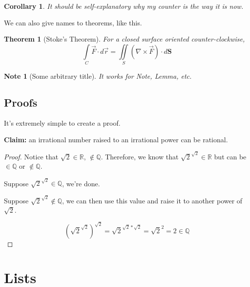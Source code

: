 \documentclass[12pt]{article}
\newtheorem*{Theorem}{Theorem}
\newtheorem{Corollary}{Corollary}[Lemma]
\newtheorem{Note}[Lemma]{Note}
\begin{document}
\begin{Corollary}
It should be self-explanatory why my counter is the way it is now.
\end{Corollary}

We can also give names to theorems, like this.

\begin{Theorem}[Stoke's Theorem]
For a closed surface oriented counter-clockwise,
\[ \int\limits_C \vec{F} \cdot d\vec{r} = \iint\limits_S (\nabla \times \vec{F}) \cdot d\textbf{S} \]
\end{Theorem}

\begin{Note}[Some arbitrary title]
It works for \emph{Note}, \emph{Lemma}, etc.
\end{Note}

\subsection{Proofs}

It's extremely simple to create a proof.

\medskip

\textbf{Claim:} an irrational number raised to an irrational power can be rational.
\begin{proof}

Notice that $\sqrt{2} \in \mathbb{R}$, $\notin \mathbb{Q}$. Therefore, we know that $\sqrt{2}^{\sqrt{2}} \in \mathbb{R}$ but can be $\in \mathbb{Q}$ or $\notin \mathbb{Q}$.

Suppose $\sqrt{2}^{\sqrt{2}} \in \mathbb{Q}$, we're done.

Suppose $\sqrt{2}^{\sqrt{2}} \notin \mathbb{Q}$, we can then use this value and raise it to another power of $\sqrt{2}$.

\[ (\sqrt{2}^{\sqrt{2}})^{\sqrt{2}} = \sqrt{2}^{\sqrt{2} * \sqrt{2}} = \sqrt{2}^2 = 2 \in \mathbb{Q} \]
\end{proof}

\section{Lists}
\end{document}

